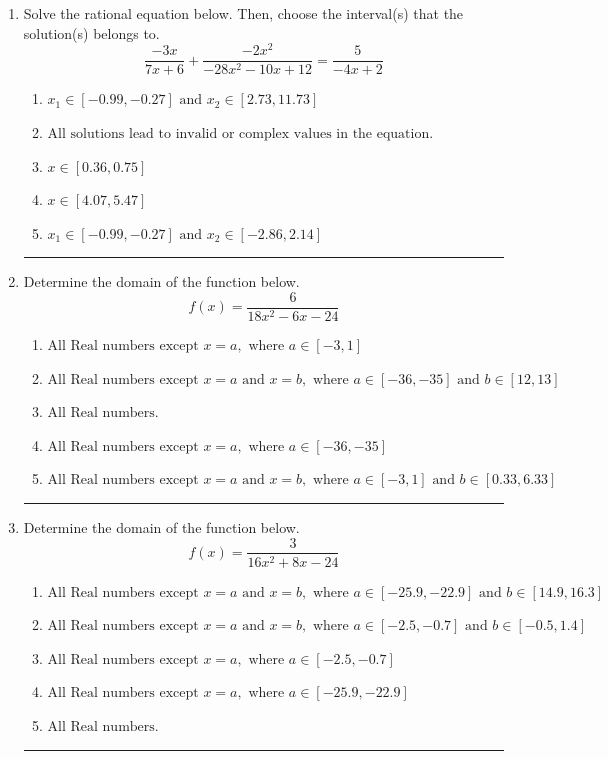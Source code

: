 \documentclass[14pt]{extbook}
\newcommand{\litem}[1]{\item#1\hspace*{-1cm}\rule{\textwidth}{0.4pt}}
\begin{document}
\begin{enumerate}
{\begin{enumerate}[label=\Alph*.]
\end{enumerate} }
\litem{
Solve the rational equation below. Then, choose the interval(s) that the solution(s) belongs to.\[ \frac{-3x}{7x + 6} + \frac{-2x^{2}}{-28x^{2} -10 x + 12} = \frac{5}{-4x + 2} \]\begin{enumerate}[label=\Alph*.]
\item \( x_1 \in [-0.99, -0.27] \text{ and } x_2 \in [2.73,11.73] \)
\item \( \text{All solutions lead to invalid or complex values in the equation.} \)
\item \( x \in [0.36,0.75] \)
\item \( x \in [4.07,5.47] \)
\item \( x_1 \in [-0.99, -0.27] \text{ and } x_2 \in [-2.86,2.14] \)

\end{enumerate} }
\litem{
Determine the domain of the function below.\[ f(x) = \frac{6}{18x^{2} -6 x -24} \]\begin{enumerate}[label=\Alph*.]
\item \( \text{All Real numbers except } x = a, \text{ where } a \in [-3, 1] \)
\item \( \text{All Real numbers except } x = a \text{ and } x = b, \text{ where } a \in [-36, -35] \text{ and } b \in [12, 13] \)
\item \( \text{All Real numbers.} \)
\item \( \text{All Real numbers except } x = a, \text{ where } a \in [-36, -35] \)
\item \( \text{All Real numbers except } x = a \text{ and } x = b, \text{ where } a \in [-3, 1] \text{ and } b \in [0.33, 6.33] \)

\end{enumerate} }
\litem{
Determine the domain of the function below.\[ f(x) = \frac{3}{16x^{2} +8 x -24} \]\begin{enumerate}[label=\Alph*.]
\item \( \text{All Real numbers except } x = a \text{ and } x = b, \text{ where } a \in [-25.9, -22.9] \text{ and } b \in [14.9, 16.3] \)
\item \( \text{All Real numbers except } x = a \text{ and } x = b, \text{ where } a \in [-2.5, -0.7] \text{ and } b \in [-0.5, 1.4] \)
\item \( \text{All Real numbers except } x = a, \text{ where } a \in [-2.5, -0.7] \)
\item \( \text{All Real numbers except } x = a, \text{ where } a \in [-25.9, -22.9] \)
\item \( \text{All Real numbers.} \)


\end{enumerate}}
\end{enumerate}
\end{document}
